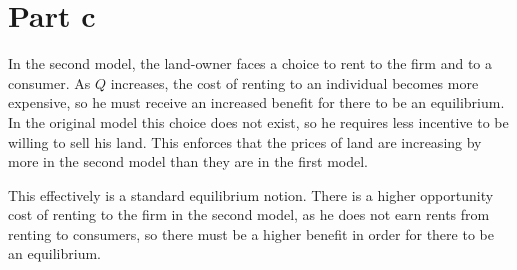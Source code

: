 \documentclass[12pt]{paper}
\begin{document}
\section*{Part c}

In the second model, the land-owner faces a choice to rent to the firm
and to a consumer. As $Q$ increases, the cost of renting to an
individual becomes more expensive, so he must receive an increased
benefit for there to be an equilibrium. In the original model this
choice does not exist, so he requires less incentive to be willing to
sell his land. This enforces that the prices of land are increasing by
more in the second model than they are in the first model.

This effectively is a standard equilibrium notion. There is a higher
opportunity cost of renting to the firm in the second model, as he
does not earn rents from renting to consumers, so there must be a
higher benefit in order for there to be an equilibrium.
\end{document}
